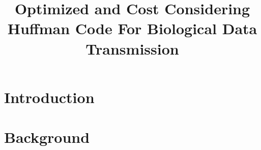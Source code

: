 \documentclass[preprint,12pt]{elsarticle}
\begin{document}
\begin{frontmatter}



\title{Optimized and Cost Considering Huffman Code For Biological Data Transmission}


\author{}

\address{}

\begin{abstract}

\end{abstract}

\begin{keyword}



\end{keyword}

\end{frontmatter}


\section{Introduction}
\section{Background}
\end{document}
